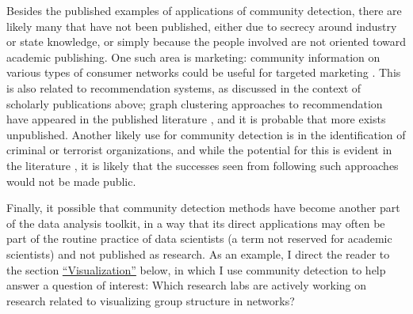 Besides the published examples of applications of community detection,
there are likely many that have not been published, either due to
secrecy around industry or state knowledge, or simply because the people
involved are not oriented toward academic publishing. One such area is
marketing: community information on various types of consumer networks
could be useful for targeted marketing
\autocite{labatut_detection_2012}. This is also related to
recommendation systems, as discussed in the context of scholarly
publications above; graph clustering approaches to recommendation have
appeared in the published literature
\autocites{reddy_graph_2002}{fouss_random-walk_2007}, and it is probable
that more exists unpublished. Another likely use for community detection
is in the identification of criminal or terrorist organizations, and
while the potential for this is evident in the literature
\autocites{krebs_mapping_2002}{nath_crime_2006}{carlos_andre_community_2012}{clauset_developmental_2012}{waskiewicz_friend_2012}{ferrara_detecting_2014},
it is likely that the successes seen from following such approaches
would not be made public.

Finally, it possible that community detection methods have become
another part of the data analysis toolkit, in a way that its direct
applications may often be part of the routine practice of data
scientists (a term not reserved for academic scientists) and not
published as research. As an example, I direct the reader to the section
\protect\hyperlink{visualization}{``Visualization''} below, in which I
use community detection to help answer a question of interest: Which
research labs are actively working on research related to visualizing
group structure in networks?
